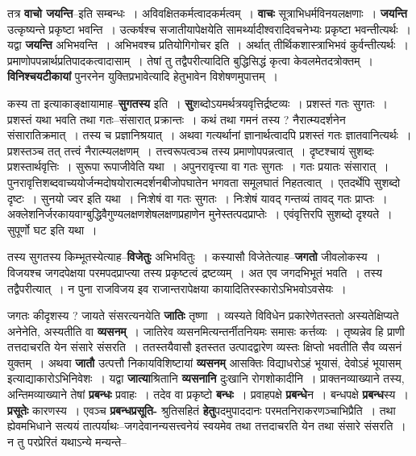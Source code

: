 \documentclass[article,12pt,a4paper]{memoir}
\begin{document}
	  \pstart तत्र \textbf{वाचो जयन्ति}--इति सम्बन्धः । अविवक्षितकर्मत्वादकर्मत्वम् । \textbf{वाचः} सूत्राभिधर्मविनयलक्षणाः । \textbf{जयन्ति} उत्कृष्यन्ते प्रकृष्टा भवन्ति । उत्कर्षश्च सजातीयापेक्षयेति सामर्थ्यादीश्वरादिवचनेभ्यः प्रकृष्टा भवन्तीत्यर्थः । यद्वा \textbf{जयन्ति} अभिभवन्ति । अभिभवश्च प्रतियोगिगोचर इति । अर्थात् तीर्थिकशास्त्राभिभवं कुर्वन्तीत्यर्थः । प्रमाणोपपन्नार्थप्रतिपादकत्वादासाम् । तेषां तु तद्वैपरीत्यादिति बुद्धिसिद्धं कृत्वा केवलमेतदत्रोक्तम् । \textbf{विनिश्चयटीकायां} पुनरनेन युक्तिप्रभावेत्यादि हेतुभावेन विशेषणमुपात्तम् ।
	\pend
      

	  \pstart कस्य ता इत्याकाङ्क्षायामाह--\textbf{सुगतस्य} इति । \textbf{सु}शब्दोऽयमर्थत्रयवृत्तिर्द्रष्टव्यः । प्रशस्तं गतः सुगतः । प्रशस्तं यथा भवति तथा गतः--संसारात् प्रक्रान्तः । कथं तथा गमनं तस्य ? नैरात्म्यदर्शनेन संसारातिक्रमात् । तस्य च प्रज्ञानिश्रयात् । अथवा गत्यर्थानां ज्ञानार्थत्वादपि प्रशस्तं गतः ज्ञातवानित्यर्थः । प्रशस्तञ्च तत् तत्त्वं नैरात्म्यलक्षणम् । तत्त्वरूपत्वञ्च तस्य प्रमाणोपपन्नत्वात् । दृष्टश्चायं सुशब्दः प्रशस्तार्थवृत्तिः । सुरूपा रूपाजीवेति यथा । अपुनरावृत्त्या वा गतः सुगतः । गतः प्रयातः संसारात् । पुनरावृत्तिशब्दवाच्ययोर्जन्मदोषयोरात्मदर्शनबीजोपघातेन भगवता समूलघातं निहतत्वात् । एतदर्थेपि सुशब्दो दृष्टः । सुनयो ज्वर इति यथा । निःशेषं वा गतः सुगतः । निःशेषं यावद् गन्तव्यं तावद् गतः प्राप्तः । अक्लेशनिर्जरकायवाग्बुद्धिवैगुण्यलक्षणशेषलक्षणप्रहाणेन मुनेस्तत्पदप्राप्तेः । एवंवृत्तिरपि सुशब्दो दृश्यते । सुपूर्णो घट इति यथा ।
	\pend
      

	  \pstart तस्य सु\leavevmode{}गतस्य किम्भूतस्येत्याह--\textbf{विजेतुः} अभिभवितुः । कस्यासौ विजेतेत्याह--\textbf{जगतो} जीवलोकस्य । विजयश्च जगदपेक्षया परमपदप्राप्त्या तस्य प्रकृष्टत्वं द्रष्टव्यम् । अत एव जगदभिभूतं भवति । तस्य तद्वैपरीत्यात् । न पुना राजविजय इव राजान्तरापेक्षया कायादितिरस्कारोऽभिभवोऽवसेयः ।
	\pend
      

	  \pstart जगतः कीदृशस्य ? जायते संसरत्यनयेति \textbf{जातिः} तृष्णा । व्यस्यते विविधेन प्रकारेणेतस्ततो अस्यतेक्षिप्यते अनेनेति, अस्यतीति वा \textbf{व्यसनम्} । जातिरेव व्यसनमित्यन्तर्नीतनियमः समासः कर्त्तव्यः । तृष्यन्नेव हि प्राणी तत्तदाचरति येन संसारे संसरति । ततस्तयैवासौ इतस्तत उत्पादद्वारेण व्यस्तः क्षिप्तो भवतीति सैव व्यसनं युक्तम् । अथवा \textbf{जातौ} उत्पत्तौ निकायविशिष्टायां \textbf{व्यसनम्} आसक्तिः विद्याधरोऽहं भूयासं, देवोऽहं भूयासम् इत्याद्याकारोऽभिनिवेशः । यद्वा \textbf{जात्या}श्रितानि \textbf{व्यसनानि} दुःखानि रोगशोकादीनि । प्राक्तनव्याख्याने तस्य, अन्तिमव्याख्याने तेषां \textbf{प्रबन्धः} प्रवाहः । तदेव वा प्रकृष्टो \textbf{बन्धः} । प्रवाहपक्षे \textbf{प्रबन्धे}न । बन्धपक्षे \textbf{प्रबन्ध}स्य । \textbf{प्रसूतेः} कारणस्य । एवञ्च \textbf{प्रबन्धप्रसूति-} श्रुतिसहितं \textbf{हेतु}पदमुपाददानः परमतनिराकरणञ्चाभिप्रैति । तथा ह्येवमभिधाने सत्ययं \leavevmode{} तात्पर्याथः--जगदेवानन्यसत्त्वनेयं स्वयमेव तथा तत्तदाचरति येन तथा संसारे संसरति । न तु परप्रेरितं यथाऽन्ये मन्यन्ते--
	\pend
      
\end{document}
